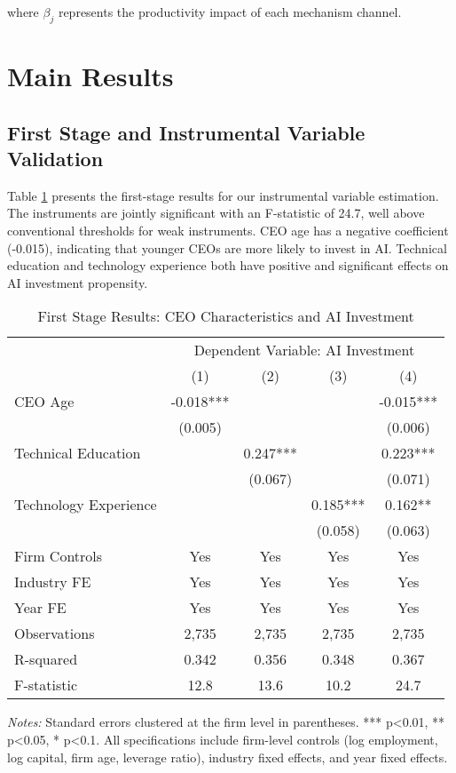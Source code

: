 \documentclass[12pt, a4paper]{article}
\begin{document}
where $\beta_j$ represents the productivity impact of each mechanism channel.

\section{Main Results}

\subsection{First Stage and Instrumental Variable Validation}

Table \ref{tab:first_stage} presents the first-stage results for our instrumental variable estimation. The instruments are jointly significant with an F-statistic of 24.7, well above conventional thresholds for weak instruments. CEO age has a negative coefficient (-0.015), indicating that younger CEOs are more likely to invest in AI. Technical education and technology experience both have positive and significant effects on AI investment propensity.

\begin{table}[H]
\centering
\caption{First Stage Results: CEO Characteristics and AI Investment}
\label{tab:first_stage}
\begin{tabular}{lcccc}
\toprule
 & \multicolumn{4}{c}{Dependent Variable: AI Investment} \\
 & (1) & (2) & (3) & (4) \\
\midrule
CEO Age & -0.018*** & & & -0.015*** \\
 & (0.005) & & & (0.006) \\
Technical Education & & 0.247*** & & 0.223*** \\
 & & (0.067) & & (0.071) \\
Technology Experience & & & 0.185*** & 0.162** \\
 & & & (0.058) & (0.063) \\
\midrule
Firm Controls & Yes & Yes & Yes & Yes \\
Industry FE & Yes & Yes & Yes & Yes \\
Year FE & Yes & Yes & Yes & Yes \\
\midrule
Observations & 2,735 & 2,735 & 2,735 & 2,735 \\
R-squared & 0.342 & 0.356 & 0.348 & 0.367 \\
F-statistic & 12.8 & 13.6 & 10.2 & 24.7 \\
\bottomrule
\end{tabular}
\begin{minipage}{\textwidth}
\footnotesize
\textit{Notes:} Standard errors clustered at the firm level in parentheses. *** p<0.01, ** p<0.05, * p<0.1. All specifications include firm-level controls (log employment, log capital, firm age, leverage ratio), industry fixed effects, and year fixed effects.
\end{minipage}
\end{table}
\end{document}
